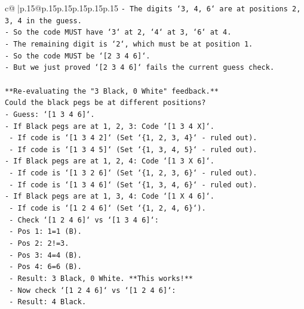 \documentclass{article}
\begin{document}
{\begin{supertabular}{c@{$\;$}|p{.15\linewidth}@{}p{.15\linewidth}p{.15\linewidth}p{.15\linewidth}p{.15\linewidth}p{.15\linewidth}}
{{{\texttt{{-}   The digits `3, 4, 6` are at positions 2, 3, 4 in the guess.} \\
\texttt{{-}   So the code MUST have `3` at 2, `4` at 3, `6` at 4.} \\
\texttt{{-}   The remaining digit is `2`, which must be at position 1.} \\
\texttt{{-}   So the code MUST be `{[}2 3 4 6{]}`.} \\
\texttt{{-}   But we just proved `{[}2 3 4 6{]}` fails the current guess check.} \\
\\ 
\texttt{**Re{-}evaluating the "3 Black, 0 White" feedback.**} \\
\texttt{Could the black pegs be at different positions?} \\
\texttt{{-}   Guess: `{[}1 3 4 6{]}`.} \\
\texttt{{-}   If Black pegs are at 1, 2, 3: Code `{[}1 3 4 X{]}`.} \\
\texttt{    {-}   If code is `{[}1 3 4 2{]}` (Set `\{1, 2, 3, 4\}` {-} ruled out).} \\
\texttt{    {-}   If code is `{[}1 3 4 5{]}` (Set `\{1, 3, 4, 5\}` {-} ruled out).} \\
\texttt{{-}   If Black pegs are at 1, 2, 4: Code `{[}1 3 X 6{]}`.} \\
\texttt{    {-}   If code is `{[}1 3 2 6{]}` (Set `\{1, 2, 3, 6\}` {-} ruled out).} \\
\texttt{    {-}   If code is `{[}1 3 4 6{]}` (Set `\{1, 3, 4, 6\}` {-} ruled out).} \\
\texttt{{-}   If Black pegs are at 1, 3, 4: Code `{[}1 X 4 6{]}`.} \\
\texttt{    {-}   If code is `{[}1 2 4 6{]}` (Set `\{1, 2, 4, 6\}`).} \\
\texttt{        {-}   Check `{[}1 2 4 6{]}` vs `{[}1 3 4 6{]}`:} \\
\texttt{            {-}   Pos 1: 1=1 (B).} \\
\texttt{            {-}   Pos 2: 2!=3.} \\
\texttt{            {-}   Pos 3: 4=4 (B).} \\
\texttt{            {-}   Pos 4: 6=6 (B).} \\
\texttt{            {-}   Result: 3 Black, 0 White. **This works!**} \\
\texttt{        {-}   Now check `{[}1 2 4 6{]}` vs `{[}1 2 4 6{]}`:} \\
\texttt{            {-}   Result: 4 Black.} \\
}}}
\end{supertabular}}
\end{document}
